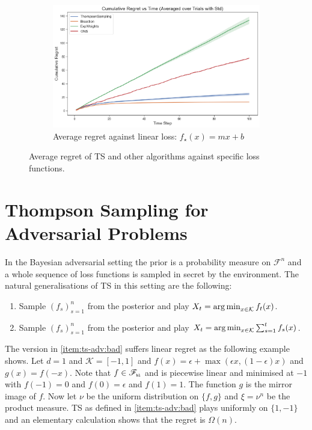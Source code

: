 \documentclass[letter, 12pt]{report}
\newcommand{\pb}{\text{\tiny\texttt{b}}}
\newcommand{\pl}{\text{\tiny\texttt{l}}}
\newcommand{\argmin}{\operatornamewithlimits{arg\,min}}
\newcommand{\cK}{\mathcal K}
\newcommand{\sF}{\mathscr F}
\newcommand{\1}{\mathbf{1}}
\newcommand{\ts}{\textsc{TS}\xspace}
\theoremstyle{plain}
\theoremstyle{definition}
\theoremstyle{remark}
\begin{document}
\begin{figure}[h!]
    \vspace{0.5em}
    \begin{subfigure}{10cm}
        \centering
        \includegraphics[width=\textwidth]{figures/linear_reg.png}
        \caption{Average regret against linear loss: $f_\star(x) = mx + b$}
        \label{fig:linear-loss-regret}
    \end{subfigure}
    \caption{Average regret of \ts and other algorithms against specific loss functions.}
    \label{fig:specific-losses-reg}
\end{figure}


\chapter{Thompson Sampling for Adversarial Problems}
\label{ch:ts-adv}
In the Bayesian adversarial setting the prior is a probability measure on $\sF^n$ and a whole sequence of loss functions is sampled in secret
by the environment.
The natural generalisations of \ts{} in this setting are the following:
\begin{enumerate}
    \item Sample $(f_s)_{s=1}^n$ from the posterior and play $X_t = \argmin_{x \in \cK} f_t(x)$. \label{item:ts-adv:bad}
    \item Sample $(f_s)_{s=1}^n$ from the posterior and play $X_t = \argmin_{x \in \cK} \sum_{s=1}^t f_s(x)$. \label{item:ts-adv:ok}
\end{enumerate}
The version in \ref{item:ts-adv:bad} suffers linear regret as the following example shows.
Let $d = 1$ and $\cK = [-1,1]$ and $f(x) = \epsilon + \max(\epsilon x, (1 - \epsilon) x)$ and $g(x) = f(-x)$.
Note that $f \in \sF_{\pb\pl}$ and is piecewise linear and minimised at $-1$ with $f(-1) = 0$ and $f(0) = \epsilon$ and $f(1) = 1$.
The function $g$ is the mirror image of $f$.
Now let $\nu$ be the uniform distribution on $\{f, g\}$ and $\xi = \nu^n$ be the product measure.
\ts{} as defined in \ref{item:ts-adv:bad} plays uniformly on $\{1, -1\}$ and an elementary calculation shows that the regret
is $\Omega(n)$.
\end{document}

